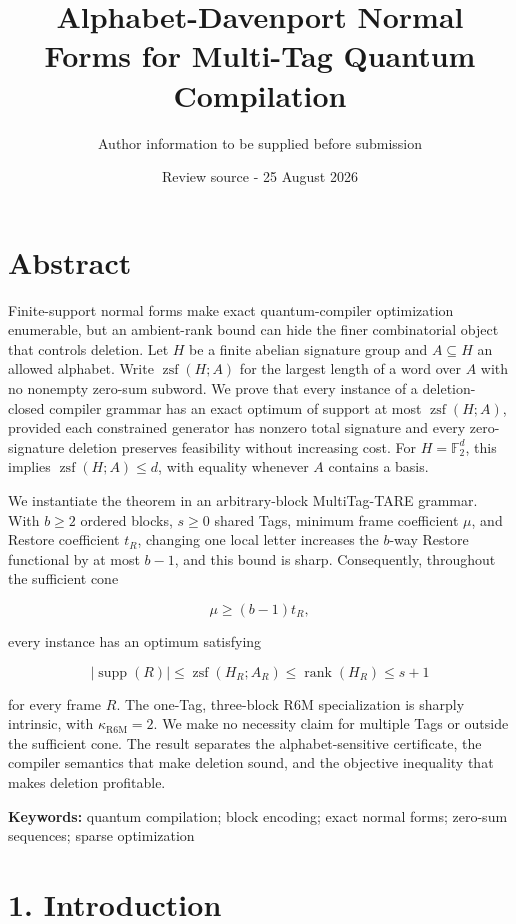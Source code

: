 \documentclass[
  11pt,
]{article}
\title{Alphabet-Davenport Normal Forms for Multi-Tag Quantum Compilation}
\author{Author information to be supplied before submission}
\date{Review source - 25 August 2026}
\begin{document}
\maketitle

\hypertarget{abstract}{%
\section{Abstract}\label{abstract}}

Finite-support normal forms make exact quantum-compiler optimization
enumerable, but an ambient-rank bound can hide the finer combinatorial
object that controls deletion. Let \(H\) be a finite abelian signature
group and \(A\subseteq H\) an allowed alphabet. Write
\(\operatorname{zsf}(H; A)\) for the largest length of a word over \(A\)
with no nonempty zero-sum subword. We prove that every instance of a
deletion-closed compiler grammar has an exact optimum of support at most
\(\operatorname{zsf}(H; A)\), provided each constrained generator has
nonzero total signature and every zero-signature deletion preserves
feasibility without increasing cost. For \(H=\mathbb F_2^d\), this
implies \(\operatorname{zsf}(H; A)\le d\), with equality whenever \(A\)
contains a basis.

We instantiate the theorem in an arbitrary-block MultiTag-TARE grammar.
With \(b\ge2\) ordered blocks, \(s\ge0\) shared Tags, minimum frame
coefficient \(\mu\), and Restore coefficient \(t_R\), changing one local
letter increases the \(b\)-way Restore functional by at most \(b-1\),
and this bound is sharp. Consequently, throughout the sufficient cone

\[
\mu\ge (b-1)t_R,
\]

every instance has an optimum satisfying

\[
|\operatorname{supp}(R)|
\le \operatorname{zsf}(H_R; A_R)
\le \operatorname{rank}(H_R)
\le s+1
\]

for every frame \(R\). The one-Tag, three-block R6M specialization is
sharply intrinsic, with \(\kappa_{\mathrm{R6M}}=2\). We make no
necessity claim for multiple Tags or outside the sufficient cone. The
result separates the alphabet-sensitive certificate, the compiler
semantics that make deletion sound, and the objective inequality that
makes deletion profitable.

\textbf{Keywords:} quantum compilation; block encoding; exact normal
forms; zero-sum sequences; sparse optimization

\hypertarget{introduction}{%
\section{1. Introduction}\label{introduction}}
\end{document}
